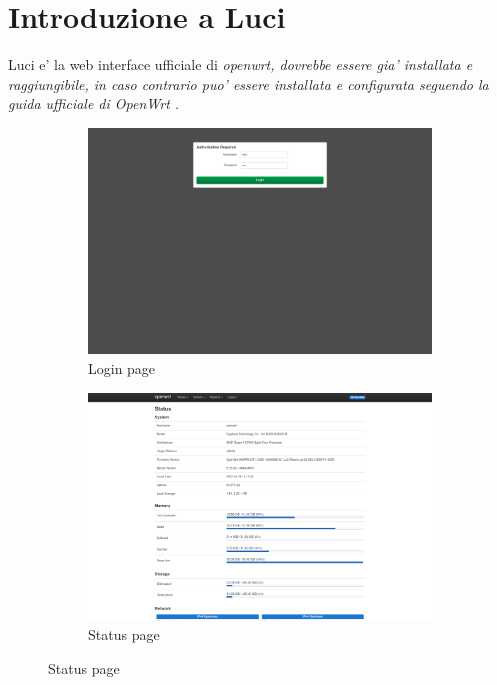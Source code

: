 \section{Introduzione a Luci}

Luci e' la web interface ufficiale di \it{openwrt}, dovrebbe essere gia' installata e raggiungibile, in caso contrario puo' essere installata e configurata seguendo la guida ufficiale di \it{OpenWrt} \cite{install-luci}.

\begin{figure}[H]
    \centering

    \begin{subfigure}{0.5\textwidth}
        \centering
        \includegraphics[height=0.6\linewidth]{immagini/LuCI_login}
        \caption{Login page}
        \label{fig:luci-login}
    \end{subfigure}%
    \hfill
    \begin{subfigure}{0.5\textwidth}
        \centering
        \includegraphics[height=0.6\linewidth]{immagini/LuCI_status}
        \caption{Status page}
        \label{fig:luci-status}
    \end{subfigure}%


\end{figure}
